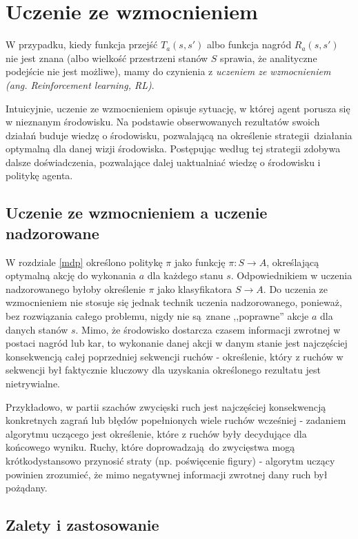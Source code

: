 \section{Uczenie ze wzmocnieniem}

W przypadku, kiedy funkcja przejść $T_a(s,s')$ albo funkcja nagród $R_a(s,s')$ nie jest znana (albo wielkość przestrzeni stanów $S$ sprawia, że analityczne podejście nie jest możliwe), mamy do czynienia z \textit{uczeniem ze wzmocnieniem (ang. Reinforcement learning, RL)}.

Intuicyjnie, uczenie ze wzmocnieniem opisuje sytuację, w której agent porusza się w nieznanym środowisku. Na podstawie obserwowanych rezultatów swoich działań buduje wiedzę o środowisku, pozwalającą na określenie strategii działania optymalną dla danej wizji środowiska. Postępując według tej strategii zdobywa dalsze doświadczenia, pozwalające dalej uaktualniać wiedzę o środowisku i politykę agenta.

\subsection{Uczenie ze wzmocnieniem a uczenie nadzorowane}
W rozdziale \ref{mdp} określono politykę $\pi$ jako funkcję $\pi: S \rightarrow A$, określającą optymalną akcję do wykonania $a$ dla każdego stanu $s$. Odpowiednikiem w uczenia nadzorowanego byłoby określenie $\pi$ jako klasyfikatora $S \rightarrow A$. Do uczenia ze wzmocnieniem nie stosuje się jednak technik uczenia nadzorowanego, ponieważ, bez rozwiązania całego problemu, nigdy nie są znane ,,poprawne'' akcje $a$ dla danych stanów $s$. Mimo, że środowisko dostarcza czasem informacji zwrotnej w postaci nagród lub kar, to wykonanie danej akcji w danym stanie jest najczęściej konsekwencją całej poprzedniej sekwencji ruchów - określenie, który z ruchów w sekwencji był faktycznie kluczowy dla uzyskania określonego rezultatu jest nietrywialne.

Przykładowo, w partii szachów zwycięski ruch jest najczęściej konsekwencją konkretnych zagrań lub błędów popełnionych wiele ruchów wcześniej - zadaniem algorytmu uczącego jest określenie, które z ruchów były decydujące dla końcowego wyniku. Ruchy, które doprowadzają do zwycięstwa mogą krótkodystansowo przynosić straty (np. poświęcenie figury) - algorytm uczący powinien zrozumieć, że mimo negatywnej informacji zwrotnej dany ruch był pożądany.

\subsection{Zalety i zastosowanie}

